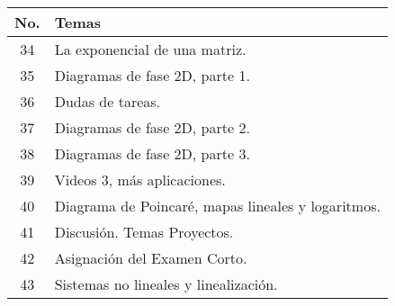 \begin{table}[H]
	\centering
	\begin{tabular}{||c|p{13cm}||}
		\hline
		\hline
			No. & Temas \\
		\hline
		\hline
			34 & La exponencial de una matriz. \\
			35 & Diagramas de fase 2D, parte 1. \\
			36 & Dudas de tareas. \\
			37 & Diagramas de fase 2D, parte 2. \\
			38 & Diagramas de fase 2D, parte 3. \\
			39 & Videos 3, más aplicaciones. \\
			40 & Diagrama de Poincaré, mapas lineales y logaritmos. \\
			41 & Discusión. Temas Proyectos. \\
			42 & Asignación del Examen Corto. \\
			43 & Sistemas no lineales y linealización. \\
		\hline
		\hline
	\end{tabular}
\end{table}





